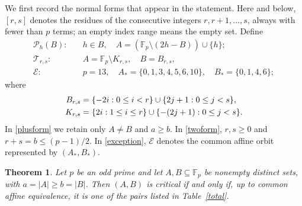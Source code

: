 \documentclass[10pt,a4paper]{amsart}
\newtheorem{theorem}{Theorem}[section]
\newcommand{\F}{\mathbb{F}_p}
\begin{document}
We first record the normal forms that appear in the statement.  Here and
below, $[r,s]$ denotes the residues of the consecutive integers
$r,r+1,\ldots,s$, always with fewer than $p$ terms; an empty index range
means the empty set.  Define
\begin{align}
\mathcal P_h(B):\quad &h\in B,\quad
 A=(\F\setminus(2h-B))\cup\{h\};\label{plusform}\\
 \mathcal T_{r,s}:\quad&A=\F\setminus K_{r,s},\quad B=B_{r,s},\label{twoform}\\
 \mathcal E:\quad&p=13,\quad A_* =\{0,1,3,4,5,6,10\},\quad
 B_* =\{0,1,4,6\};\label{exception}
\end{align}
where
\begin{align}
B_{r,s}&=\{-2i:0\le i<r\}\cup\{2j+1:0\le j<s\},\notag \\
K_{r,s}&=\{2i:1\le i\le r\}\cup\{-(2j+1):0\le j<s\}.\notag
\end{align}
In \eqref{plusform} we retain only $A\ne B$ and $a\ge b$.  In
\eqref{twoform}, $r,s\ge0$ and $r+s=b\le(p-1)/2$.  In
\eqref{exception}, $\mathcal E$ denotes the common affine orbit
represented by $(A_*,B_*)$.


\begin{theorem}\label{main}
Let $p$ be an odd prime and let $A,B\subseteq\F$ be nonempty distinct
sets, with $a=|A|\ge b=|B|$. Then $(A,B)$ is critical if and only if,
up to common affine equivalence, it is one of the pairs listed in
Table~\ref{total}.
\end{theorem}
\end{document}
